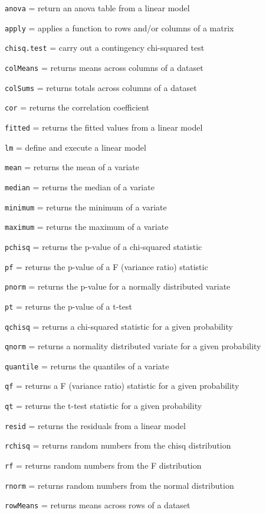 \documentclass[
]{book}
\begin{document}
\texttt{anova} = return an anova table from a linear model

\texttt{apply} = applies a function to rows and/or columns of a matrix

\texttt{chisq.test} = carry out a contingency chi-squared test

\texttt{colMeans} = returns means across columns of a dataset

\texttt{colSums} = returns totals across columns of a dataset

\texttt{cor} = returns the correlation coefficient

\texttt{fitted} = returns the fitted values from a linear model

\texttt{lm} = define and execute a linear model

\texttt{mean} = returns the mean of a variate

\texttt{median} = returns the median of a variate

\texttt{minimum} = returns the minimum of a variate

\texttt{maximum} = returns the maximum of a variate

\texttt{pchisq} = returns the p-value of a chi-squared statistic

\texttt{pf} = returns the p-value of a F (variance ratio) statistic

\texttt{pnorm} = returns the p-value for a normally distributed variate

\texttt{pt} = returns the p-value of a t-test

\texttt{qchisq} = returns a chi-squared statistic for a given probability

\texttt{qnorm} = returns a normality distributed variate for a given probability

\texttt{quantile} = returns the quantiles of a variate

\texttt{qf} = returns a F (variance ratio) statistic for a given probability

\texttt{qt} = returns the t-test statistic for a given probability

\texttt{resid} = returns the residuals from a linear model

\texttt{rchisq} = returns random numbers from the chisq distribution

\texttt{rf} = returns random numbers from the F distribution

\texttt{rnorm} = returns random numbers from the normal distribution

\texttt{rowMeans} = returns means across rows of a dataset
\end{document}
